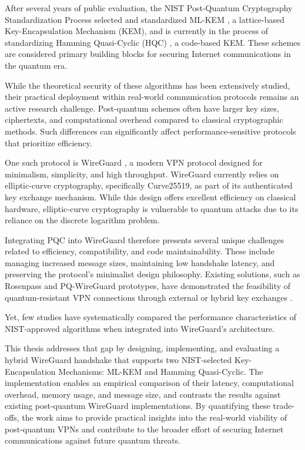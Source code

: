 After several years of public evaluation, the NIST Post-Quantum Cryptography Standardization Process selected and standardized ML-KEM \cite{mlkem}, a lattice-based Key-Encapsulation Mechanism (KEM), and is currently in the process of standardizing Hamming Quasi-Cyclic (HQC) \cite{hqc}, a code-based KEM. These schemes are considered primary building blocks for securing Internet communications in the quantum era. 

While the theoretical security of these algorithms has been extensively studied, their practical deployment within real-world communication protocols remains an active research challenge. Post-quantum schemes often have larger key sizes, ciphertexts, and computational overhead compared to classical cryptographic methods. Such differences can significantly affect performance-sensitive protocols that prioritize efficiency.

One such protocol is WireGuard \cite{wireguard}, a modern VPN protocol designed for minimalism, simplicity, and high throughput. WireGuard currently relies on elliptic-curve cryptography, specifically Curve25519, as part of its authenticated key exchange mechanism. While this design offers excellent efficiency on classical hardware, elliptic-curve cryptography is vulnerable to quantum attacks due to its reliance on the discrete logarithm problem.

Integrating PQC into WireGuard therefore presents several unique challenges related to efficiency, compatibility, and code maintainability. These include managing increased message sizes, maintaining low handshake latency, and preserving the protocol's minimalist design philosophy. Existing solutions, such as Rosenpass and PQ-WireGuard prototypes, have demonstrated the feasibility of quantum-resistant VPN connections through external or hybrid key exchanges \cite{rosenpass}\cite{pqwg}\cite{rebar}.

Yet, few studies have systematically compared the performance characteristics of NIST-approved algorithms when integrated into WireGuard's architecture.

This thesis addresses that gap by designing, implementing, and evaluating a hybrid WireGuard handshake that supports two NIST-selected Key-Encapsulation Mechanisms: ML-KEM and Hamming Quasi-Cyclic. The implementation enables an empirical comparison of their latency, computational overhead, memory usage, and message size, and contrasts the results against existing post-quantum WireGuard implementations. By quantifying these trade-offs, the work aims to provide practical insights into the real-world viability of post-quantum VPNs and contribute to the broader effort of securing Internet communications against future quantum threats.

